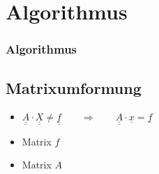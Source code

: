 \section{Algorithmus}

\begin{frame}
\frametitle{Algorithmus} 
\end{frame}

\newcommand{\dunderline}[1]{\underline{\underline{#1}}}
\subsection{Matrixumformung}
\begin{frame}
\begin{itemize}[<+->]
	\item $\dunderline{A}\cdot \dunderline{X} \ne \dunderline{f} \qquad\Rightarrow\qquad \dunderline{A}\cdot \underline{x} = \underline{f}$
	\item Matrix $f$
	\item Matrix $A$
\end{itemize}


\end{frame}

